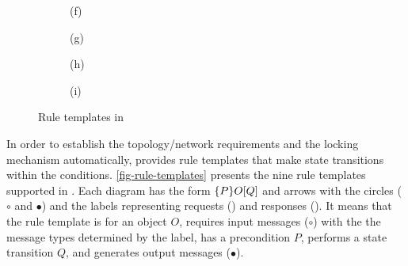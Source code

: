 \documentclass[sigplan,10pt,review,anonymous,screen]{acmart}\settopmatter{printfolios=true,printccs=false,printacmref=false}
\begin{document}
\begin{figure}[t]
\begin{subfigure}[b]{0.32\columnwidth}
    \captionsetup{labelformat=empty}
    \caption{(f) }
  \end{subfigure}
  \begin{subfigure}[b]{0.32\columnwidth}
    \centering
    \vspace{5pt}
    \captionsetup{labelformat=empty}
    \caption{(g) }
  \end{subfigure}
  \begin{subfigure}[b]{0.32\columnwidth}
    \centering
    \captionsetup{labelformat=empty}
    \caption{(h) }
  \end{subfigure}
  \begin{subfigure}[b]{0.32\columnwidth}
    \centering
    \captionsetup{labelformat=empty}
    \caption{(i) }
  \end{subfigure}
  \caption{Rule templates in \hemiola{}}
  \label{fig-rule-templates}
\end{figure}

In order to establish the topology/network requirements and the locking mechanism automatically, \hemiola{} provides rule templates that make state transitions within the conditions.
\autoref{fig-rule-templates} presents the nine rule templates supported in \hemiola{}.
Each diagram has the form $\{P\}O\lbrack Q\rbrack$ and arrows with the circles ($\circ$ and $\bullet$) and the labels representing requests () and responses ().
It means that the rule template is for an object $O$, requires input messages ($\circ$) with the the message types determined by the label, has a precondition $P$, performs a state transition $Q$, and generates output messages ($\bullet$).
\end{document}
